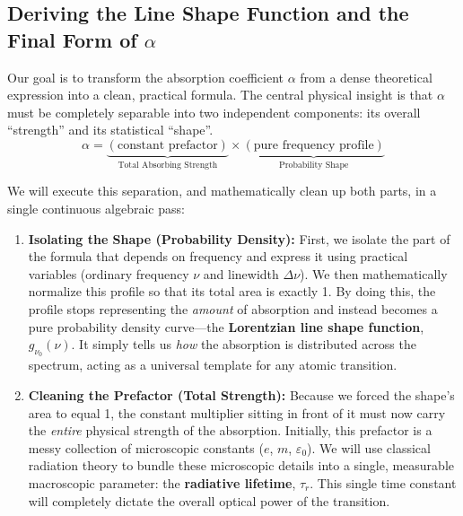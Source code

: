 \subsection{Deriving the Line Shape Function and the Final Form of \texorpdfstring{$\alpha$}{α}}

Our goal is to transform the absorption coefficient $\alpha$ from a dense theoretical expression into a clean, practical formula. The central physical insight is that $\alpha$ must be completely separable into two independent components: its overall ``strength'' and its statistical ``shape''.
\begin{equation*}
    \alpha = \underbrace{(\text{constant prefactor})}_{\text{Total Absorbing Strength}} \times \underbrace{(\text{pure frequency profile})}_{\text{Probability Shape}}
\end{equation*}

We will execute this separation, and mathematically clean up both parts, in a single continuous algebraic pass:
\begin{enumerate}
    \item \textbf{Isolating the Shape (Probability Density):} First, we isolate the part of the formula that depends on frequency and express it using practical variables (ordinary frequency $\nu$ and linewidth $\Delta\nu$). We then mathematically normalize this profile so that its total area is exactly 1. By doing this, the profile stops representing the \emph{amount} of absorption and instead becomes a pure probability density curve—the \textbf{Lorentzian line shape function}, $g_{\nu_0}(\nu)$. It simply tells us \emph{how} the absorption is distributed across the spectrum, acting as a universal template for any atomic transition.
    \item \textbf{Cleaning the Prefactor (Total Strength):} Because we forced the shape's area to equal 1, the constant multiplier sitting in front of it must now carry the \emph{entire} physical strength of the absorption. Initially, this prefactor is a messy collection of microscopic constants ($e$, $m$, $\varepsilon_0$). We will use classical radiation theory to bundle these microscopic details into a single, measurable macroscopic parameter: the \textbf{radiative lifetime}, $\tau_r$. This single time constant will completely dictate the overall optical power of the transition.
\end{enumerate}

